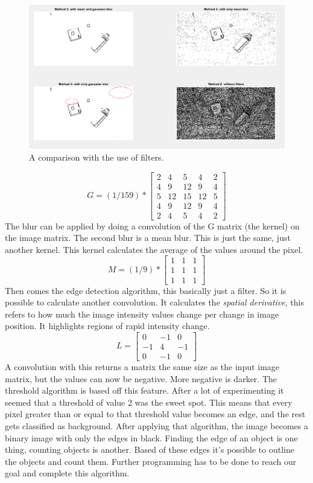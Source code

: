 \documentclass[11pt]{article}
\begin{document}
\begin{figure}[h]
	\center
  \includegraphics[width=0.7\linewidth]{filter_comparison.png}
  \caption{A comparison with the use of filters.}
  \label{fig:filter_comparison}
\end{figure}

\begin{equation}
  G = (1/159) * 
  \begin{bmatrix}
   2 & 4 & 5 & 4 & 2\\
   4 & 9 & 12 & 9 & 4\\
   5 & 12 & 15 & 12 & 5\\
   4 & 9 & 12 & 9& 4\\
   2 & 4 & 5 & 4 & 2
  \end{bmatrix}
\end{equation}
The blur can be applied by doing a convolution of the G matrix (the kernel) on the image matrix.
The second blur is a mean blur. This is just the same, just another kernel. This kernel calculates the average of the values around the pixel.
\begin{equation}
M = (1/9) * 
\begin{bmatrix}
	1&1&1\\
	1&1&1\\
	1&1&1
\end{bmatrix}
\end{equation}
Then comes the edge detection algorithm, this basically just a filter. So it is possible to calculate another convolution. It calculates the \textit{spatial  derivative}, this refers to how much the image intensity values change per change in image position. It highlights regions of rapid intensity change.
\begin{equation}
L =\begin{bmatrix}
	0&-1&0\\
	-1&4&-1\\
	0&-1&0
\end{bmatrix}
\end{equation}
A convolution with this returns a matrix the same size as the input image matrix, but the values can now be negative. More negative is darker. The threshold algorithm is based off this feature. After a lot of experimenting it seemed that a threshold of value 2 was the sweet spot. This means that every pixel greater than or equal to that threshold value becomes an edge, and the rest gets classified as background. After applying that algorithm, the image becomes a binary image with only the edges in black. Finding the edge of an object is one thing, counting objects is another. Based of these edges it's possible to outline the objects and count them. Further programming has to be done to reach our goal and complete this algorithm.
\end{document}
